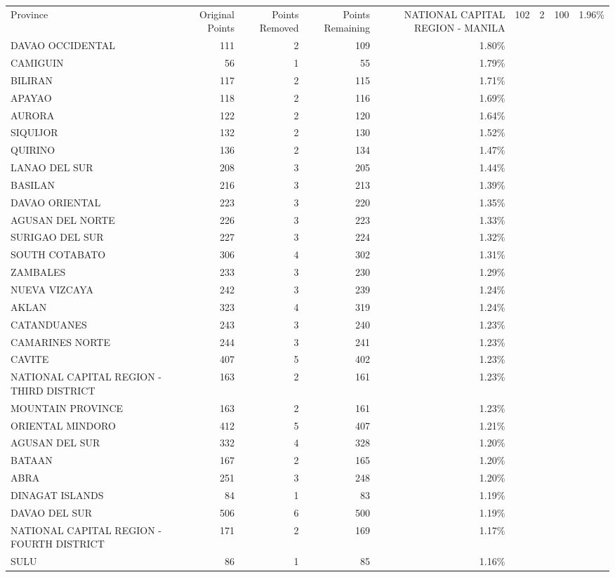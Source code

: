 \begin{tabular}{lrrrr}
\toprule
Province & Original Points & Points Removed & Points Remaining & %
\midrule
NATIONAL CAPITAL REGION - MANILA & 102 & 2 & 100 & 1.96\% \\
DAVAO OCCIDENTAL & 111 & 2 & 109 & 1.80\% \\
CAMIGUIN & 56 & 1 & 55 & 1.79\% \\
BILIRAN & 117 & 2 & 115 & 1.71\% \\
APAYAO & 118 & 2 & 116 & 1.69\% \\
AURORA & 122 & 2 & 120 & 1.64\% \\
SIQUIJOR & 132 & 2 & 130 & 1.52\% \\
QUIRINO & 136 & 2 & 134 & 1.47\% \\
LANAO DEL SUR & 208 & 3 & 205 & 1.44\% \\
BASILAN & 216 & 3 & 213 & 1.39\% \\
DAVAO ORIENTAL & 223 & 3 & 220 & 1.35\% \\
AGUSAN DEL NORTE & 226 & 3 & 223 & 1.33\% \\
SURIGAO DEL SUR & 227 & 3 & 224 & 1.32\% \\
SOUTH COTABATO & 306 & 4 & 302 & 1.31\% \\
ZAMBALES & 233 & 3 & 230 & 1.29\% \\
NUEVA VIZCAYA & 242 & 3 & 239 & 1.24\% \\
AKLAN & 323 & 4 & 319 & 1.24\% \\
CATANDUANES & 243 & 3 & 240 & 1.23\% \\
CAMARINES NORTE & 244 & 3 & 241 & 1.23\% \\
CAVITE & 407 & 5 & 402 & 1.23\% \\
NATIONAL CAPITAL REGION - THIRD DISTRICT & 163 & 2 & 161 & 1.23\% \\
MOUNTAIN PROVINCE & 163 & 2 & 161 & 1.23\% \\
ORIENTAL MINDORO & 412 & 5 & 407 & 1.21\% \\
AGUSAN DEL SUR & 332 & 4 & 328 & 1.20\% \\
BATAAN & 167 & 2 & 165 & 1.20\% \\
ABRA & 251 & 3 & 248 & 1.20\% \\
DINAGAT ISLANDS & 84 & 1 & 83 & 1.19\% \\
DAVAO DEL SUR & 506 & 6 & 500 & 1.19\% \\
NATIONAL CAPITAL REGION - FOURTH DISTRICT & 171 & 2 & 169 & 1.17\% \\
SULU & 86 & 1 & 85 & 1.16\% \\

\end{tabular}

